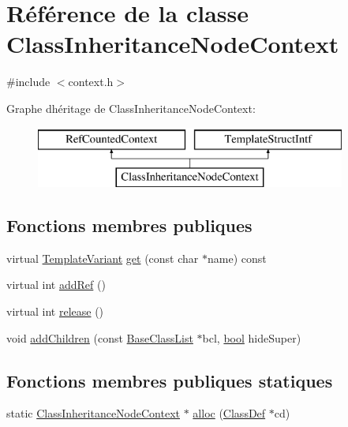 \hypertarget{class_class_inheritance_node_context}{}\section{Référence de la classe Class\+Inheritance\+Node\+Context}
\label{class_class_inheritance_node_context}


{\ttfamily \#include $<$context.\+h$>$}

Graphe d\textquotesingle{}héritage de Class\+Inheritance\+Node\+Context\+:\begin{figure}[H]
\begin{center}
\leavevmode
\includegraphics[height=2.000000cm]{class_class_inheritance_node_context}
\end{center}
\end{figure}
\subsection*{Fonctions membres publiques}
\begin{DoxyCompactItemize}
\item 
virtual \hyperlink{class_template_variant}{Template\+Variant} \hyperlink{class_class_inheritance_node_context_a77a43099cd2e89cbff8192cf3948d6a7}{get} (const char $\ast$name) const 
\item 
virtual int \hyperlink{class_class_inheritance_node_context_a657382620f42bf8cf7119c647930c0ec}{add\+Ref} ()
\item 
virtual int \hyperlink{class_class_inheritance_node_context_adb0ebd43b613667b492399bbeef87ef1}{release} ()
\item 
void \hyperlink{class_class_inheritance_node_context_aea17061580ccef279863ef2e15499d52}{add\+Children} (const \hyperlink{class_base_class_list}{Base\+Class\+List} $\ast$bcl, \hyperlink{qglobal_8h_a1062901a7428fdd9c7f180f5e01ea056}{bool} hide\+Super)
\end{DoxyCompactItemize}
\subsection*{Fonctions membres publiques statiques}
\begin{DoxyCompactItemize}
\item 
static \hyperlink{class_class_inheritance_node_context}{Class\+Inheritance\+Node\+Context} $\ast$ \hyperlink{class_class_inheritance_node_context_a64ec6ac918a696dafb83cf204e12a3a2}{alloc} (\hyperlink{class_class_def}{Class\+Def} $\ast$cd)
\end{DoxyCompactItemize}


